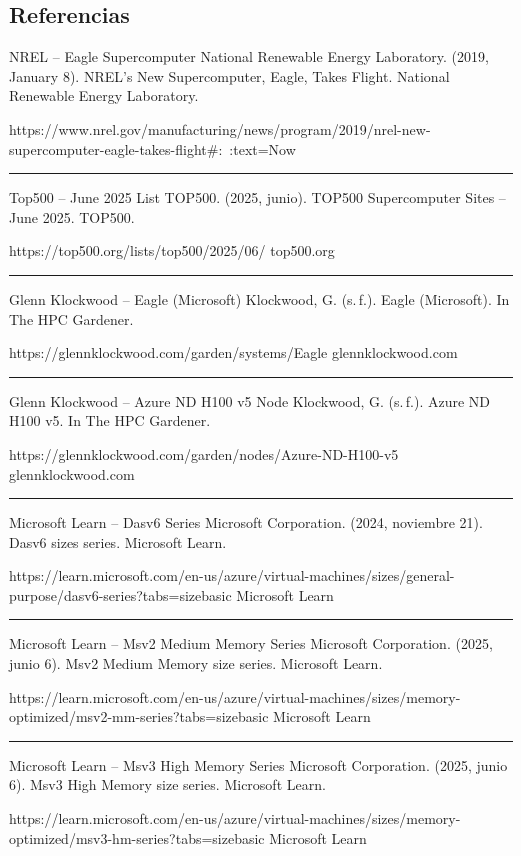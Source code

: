 \subsection{Referencias}

NREL – Eagle Supercomputer
National Renewable Energy Laboratory. (2019, January 8). NREL’s New Supercomputer, 
Eagle, Takes Flight. National Renewable Energy Laboratory. 
 
 https://www.nrel.gov/manufacturing/news/program/2019/nrel-new-supercomputer-eagle-takes-flight#:~:text=Now%

\noindent\rule{\textwidth}{0.4pt}

Top500 – June 2025 List
TOP500. (2025, junio). TOP500 Supercomputer Sites – June 2025. TOP500. 
 
https://top500.org/lists/top500/2025/06/ top500.org

\noindent\rule{\textwidth}{0.4pt}

Glenn Klockwood – Eagle (Microsoft)
Klockwood, G. (s. f.). Eagle (Microsoft). In The HPC Gardener. 
 
https://glennklockwood.com/garden/systems/Eagle glennklockwood.com

\noindent\rule{\textwidth}{0.4pt}

Glenn Klockwood – Azure ND H100 v5 Node
Klockwood, G. (s. f.). Azure ND H100 v5. In The HPC Gardener. 
 
https://glennklockwood.com/garden/nodes/Azure-ND-H100-v5 glennklockwood.com

\noindent\rule{\textwidth}{0.4pt}

Microsoft Learn – Dasv6 Series
Microsoft Corporation. (2024, noviembre 21). Dasv6 sizes series. Microsoft Learn. 
 
https://learn.microsoft.com/en-us/azure/virtual-machines/sizes/general-purpose/dasv6-series?tabs=sizebasic Microsoft Learn

\noindent\rule{\textwidth}{0.4pt}

Microsoft Learn – Msv2 Medium Memory Series
Microsoft Corporation. (2025, junio 6). Msv2 Medium Memory size series. Microsoft Learn. 
 
https://learn.microsoft.com/en-us/azure/virtual-machines/sizes/memory-optimized/msv2-mm-series?tabs=sizebasic Microsoft Learn

\noindent\rule{\textwidth}{0.4pt}

Microsoft Learn – Msv3 High Memory Series
Microsoft Corporation. (2025, junio 6). Msv3 High Memory size series. Microsoft Learn. 

https://learn.microsoft.com/en-us/azure/virtual-machines/sizes/memory-optimized/msv3-hm-series?tabs=sizebasic Microsoft Learn
 